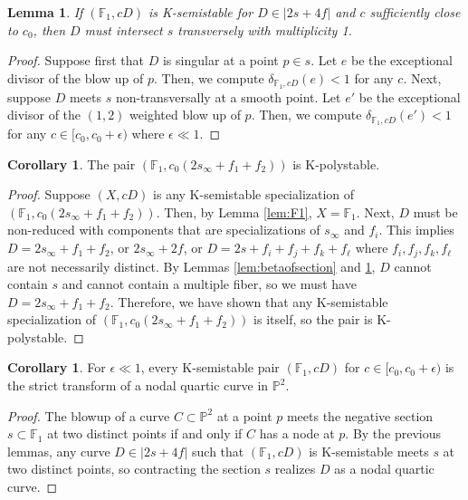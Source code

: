 \documentclass[11pt]{amsart}
\numberwithin{equation}{section}
\newtheorem{lemma}[theorem]{Lemma}
\theoremstyle{definition}
\newtheorem{corollary}[theorem]{Corollary}
\newcommand{\bF}{\mathbb{F}}
\newcommand{\bP}{\mathbb{P}}
\begin{document}
\begin{lemma}\label{lem:transverse}
    If $(\bF_1, cD)$ is K-semistable for $D \in |2s + 4f|$ and $c$ sufficiently close to $c_0$, then $D$ must intersect $s$ transversely with multiplicity 1.
\end{lemma}

\begin{proof}
    Suppose first that $D$ is singular at a point $p \in s$.  Let $e$ be the exceptional divisor of the blow up of $p$.  Then, we compute $\delta_{\bF_1, cD}(e) < 1$ for any $c$.  Next, suppose $D$ meets $s$ non-transversally at a smooth point.  Let $e'$ be the exceptional divisor of the $(1,2)$ weighted blow up of $p$.  Then, we compute $\delta_{\bF_1, cD}(e') < 1$ for any $c \in [c_0, c_0 + \epsilon)$ where $\epsilon \ll 1$.    
\end{proof}

\begin{corollary}
    The pair $(\bF_1, c_0(2s_\infty + f_1 + f_2))$ is K-polystable.
\end{corollary}

\begin{proof}
    Suppose $(X, cD)$ is any K-semistable specialization of $(\bF_1, c_0(2s_\infty + f_1 + f_2))$.  Then, by Lemma \ref{lem:F1}, $X = \bF_1$.  Next, $D$ must be non-reduced with components that are specializations of $s_\infty$ and $f_i$.  This implies $D = 2s_\infty + f_1 + f_2$, or $2s_\infty + 2f$, or $D = 2s + f_i + f_j + f_k + f_{\ell}$ where $f_i,f_j,f_k,f_\ell$ are not necessarily distinct.  By Lemmas \ref{lem:betaofsection} and \ref{lem:transverse}, $D$ cannot contain $s$ and cannot contain a multiple fiber, so we must have $D = 2s_\infty + f_1 + f_2$.  Therefore, we have shown that any K-semistable specialization of $(\bF_1, c_0(2s_\infty + f_1 + f_2))$ is itself, so the pair is K-polystable. 
\end{proof}

\begin{corollary}
    For $\epsilon \ll 1$, every K-semistable pair $(\bF_1, cD)$ for $c \in [c_0, c_0 + \epsilon)$ is the strict transform of a nodal quartic curve in $\bP^2$.
\end{corollary}

\begin{proof}
    The blowup of a curve $C \subset \bP^2$ at a point $p$ meets the negative section $s \subset \bF_1$ at two distinct points if and only if $C$ has a node at $p$.  By the previous lemmas, any curve $D \in |2s + 4f|$ such that $(\bF_1, cD)$ is K-semistable meets $s$ at two distinct points, so contracting the section $s$ realizes $D$ as a nodal quartic curve. 
\end{proof}
\end{document}
